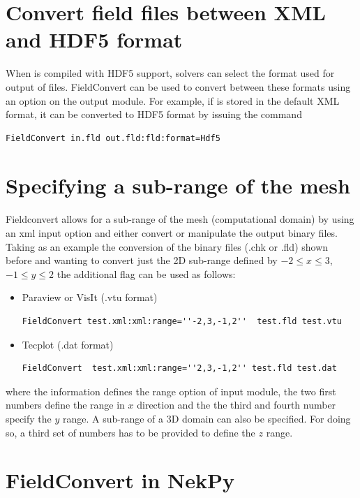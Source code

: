 \section{Convert field files between XML and HDF5 format}
%
When \nekpp is compiled with HDF5 support, solvers can select the format used
for output of  files. FieldConvert can be used to convert between
these formats using an option on the  output module. For example, if
 is stored in the default XML format, it can be converted to HDF5
format by issuing the command
%
\begin{lstlisting}[style=BashInputStyle]
FieldConvert in.fld out.fld:fld:format=Hdf5
\end{lstlisting}
%
\section{Specifying a sub-range of the mesh}
Fieldconvert allows for a sub-range of the mesh (computational
domain) by using an xml input option and either convert or manipulate
the \nekpp output binary files.  Taking as an example the conversion
of the \nekpp binary files (.chk or .fld) shown before and wanting to
convert just the 2D sub-range defined by $-2\leq x \leq 3$, $-1\leq y
\leq 2$ the additional flag  can be used as follows:
%
\begin{itemize}
\item Paraview or VisIt (.vtu format)
%
\begin{lstlisting}[style=BashInputStyle]
FieldConvert test.xml:xml:range=''-2,3,-1,2''  test.fld test.vtu
\end{lstlisting}
%
\item Tecplot (.dat format)
%
\begin{lstlisting}[style=BashInputStyle]
FieldConvert  test.xml:xml:range=''2,3,-1,2'' test.fld test.dat
\end{lstlisting}
%
\end{itemize}
where the  information defines the range option of
 input module, the two first numbers define the range in
$x$ direction and the the third and fourth number specify the $y$
range.  A sub-range of a 3D domain can also be specified.  For doing
so, a third set of numbers has to be provided to define the $z$ range.

%
%

\section{FieldConvert in NekPy}

